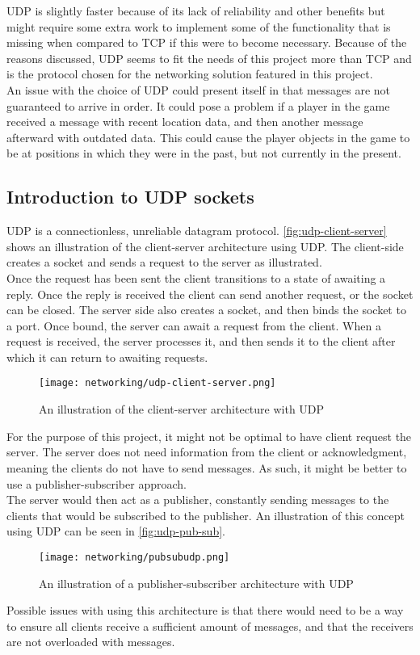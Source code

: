 UDP is slightly faster because of its lack of reliability and other benefits but might require some extra work to implement some of the functionality that is missing when compared to TCP if this were to become necessary.
Because of the reasons discussed, UDP seems to fit the needs of this project more than TCP and is the protocol chosen for the networking solution featured in this project.\\
An issue with the choice of UDP could present itself in that messages are not guaranteed to arrive in order.
It could pose a problem if a player in the game received a message with recent location data, and then another message afterward with outdated data.
This could cause the player objects in the game to be at positions in which they were in the past, but not currently in the present.

\subsection{Introduction to UDP sockets}
UDP is a connectionless, unreliable datagram protocol.
\autoref{fig:udp-client-server} shows an illustration of the client-server architecture using UDP.
The client-side creates a socket and sends a request to the server as illustrated.\\
Once the request has been sent the client transitions to a state of awaiting a reply.
Once the reply is received the client can send another request, or the socket can be closed. 
The server side also creates a socket, and then binds the socket to a port.
Once bound, the server can await a request from the client.
When a request is received, the server processes it, and then sends it to the client after which it can return to awaiting requests.
\begin{figure}[H]
    \centering
    \texttt{[image: networking/udp-client-server.png]}
    \caption{An illustration of the client-server architecture with UDP}
    \label{fig:udp-client-server}
\end{figure}
\noindent
For the purpose of this project, it might not be optimal to have client request the server.
The server does not need information from the client or acknowledgment, meaning the clients do not have to send messages.
As such, it might be better to use a publisher-subscriber approach.\\
The server would then act as a publisher, constantly sending messages to the clients that would be subscribed to the publisher.
An illustration of this concept using UDP can be seen in \autoref{fig:udp-pub-sub}.
\begin{figure}[H]
    \centering
    \texttt{[image: networking/pubsubudp.png]}
    \caption{An illustration of a publisher-subscriber architecture with UDP}
    \label{fig:udp-pub-sub}
\end{figure}
\noindent
Possible issues with using this architecture is that there would need to be a way to ensure all clients receive a sufficient amount of messages, and that the receivers are not overloaded with messages.

